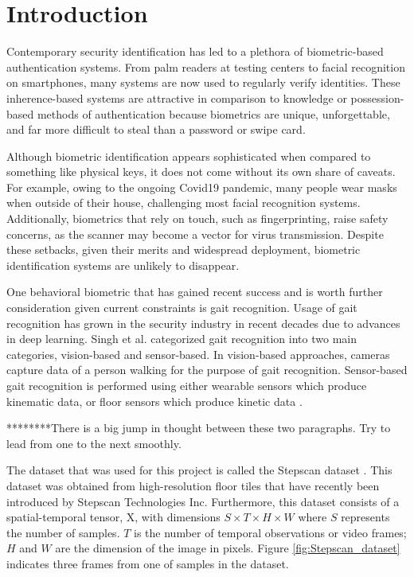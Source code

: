 \section{Introduction}

Contemporary security identification has led to a plethora of biometric-based authentication systems. From palm readers at testing centers to facial recognition on smartphones, many systems are now used to regularly verify identities. These inherence-based systems are attractive in comparison to knowledge or possession-based methods of authentication because biometrics are unique, unforgettable, and far more difficult to steal than a password or swipe card.

Although biometric identification appears sophisticated when compared to something like physical keys, it does not come without its own share of caveats. For example, owing to the ongoing Covid19 pandemic, many people wear masks when outside of their house, challenging most facial recognition systems. Additionally, biometrics that rely on touch, such as fingerprinting, raise safety concerns, as the scanner may become a vector for virus transmission. Despite these setbacks, given their merits and widespread deployment, biometric identification systems are unlikely to disappear.

One behavioral biometric that has gained recent success and is worth further consideration given current constraints is gait recognition. Usage of gait recognition has grown in the security industry in recent decades due to advances in deep learning. Singh et al. \cite{Singh2019APerspectives} categorized gait recognition into two main categories, vision-based and sensor-based. In vision-based approaches, cameras capture data of a person walking for the purpose of gait recognition. Sensor-based gait recognition is performed using either wearable sensors which produce kinematic data, or floor sensors which produce kinetic data \cite{Connor2018BiometricFeatures}.


********There is a big jump in thought between these two paragraphs.  Try to lead from one to the next smoothly.

The dataset that was used for this project is called the Stepscan dataset \cite{Connor2015ComparingBiometrics}. This dataset was obtained from high-resolution floor tiles that have recently been introduced by Stepscan Technologies Inc. Furthermore, this dataset consists of a spatial-temporal tensor, X, with dimensions $S \times T \times H \times W$ where $S$ represents the number of samples. $T$ is the number of temporal observations or video frames; $H$ and $W$ are the dimension of the image in pixels. Figure \ref{fig:Stepscan_dataset} indicates three frames from one of samples in the dataset.  

